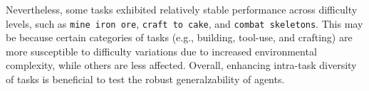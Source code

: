 Nevertheless, some tasks exhibited relatively stable performance across difficulty levels, such as \texttt{mine iron ore}, \texttt{craft to cake}, and \texttt{combat skeletons}. This may be because certain categories of tasks (e.g., building, tool-use, and crafting) are more susceptible to difficulty variations due to increased environmental complexity, while others are less affected. Overall, enhancing intra-task diversity of tasks is beneficial to test the robust generalzability of agents.





